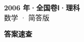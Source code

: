 \documentclass[zihao=-4, a4paper]{ctexart}
\begin{document}
\begin{center}
  {\Large\bfseries 2006 年·全国卷Ⅰ·理科}\\[4pt]
  {\large 数学 · 简答版}
\end{center}
\medskip
{}

\clearpage
{}
\begin{center}{\Large\bfseries 答案速查}\end{center}
\medskip

\end{document}
